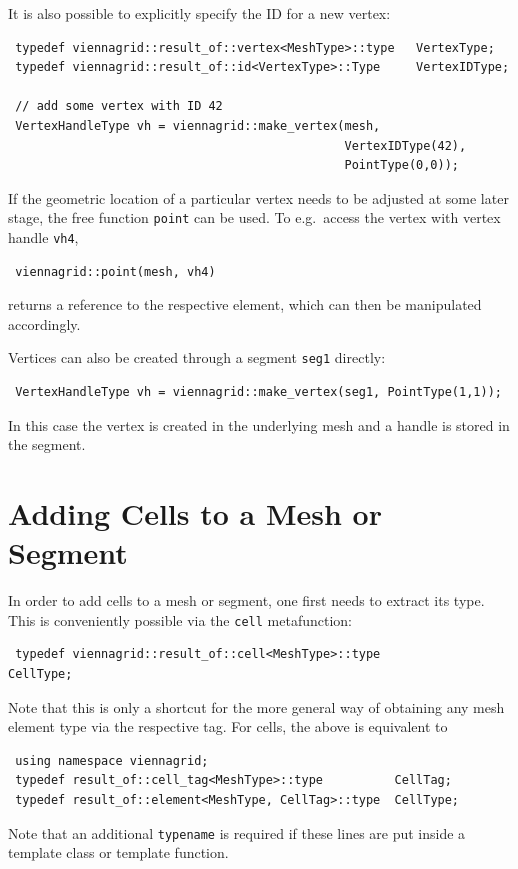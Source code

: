 It is also possible to explicitly specify the ID for a new vertex:
\begin{lstlisting}
 typedef viennagrid::result_of::vertex<MeshType>::type   VertexType;
 typedef viennagrid::result_of::id<VertexType>::Type     VertexIDType;

 // add some vertex with ID 42
 VertexHandleType vh = viennagrid::make_vertex(mesh,
                                               VertexIDType(42),
                                               PointType(0,0));
\end{lstlisting}

If the geometric location of a particular vertex needs to be adjusted at some later stage, the free function \lstinline|point| can be used.
To e.g.~access the vertex with vertex handle \lstinline|vh4|,
\begin{lstlisting}
 viennagrid::point(mesh, vh4)
\end{lstlisting}
returns a reference to the respective element, which can then be manipulated accordingly.

Vertices can also be created through a segment \lstinline|seg1| directly:
\begin{lstlisting}
 VertexHandleType vh = viennagrid::make_vertex(seg1, PointType(1,1));
\end{lstlisting}
In this case the vertex is created in the underlying mesh and a handle is stored in the segment.


\section{Adding Cells to a Mesh or Segment}
In order to add cells to a mesh or segment, one first needs to extract its type.
This is conveniently possible via the \lstinline|cell| metafunction:
\begin{lstlisting}
 typedef viennagrid::result_of::cell<MeshType>::type              CellType;
\end{lstlisting}
Note that this is only a shortcut for the more general way of obtaining any mesh element type via the respective tag.
For cells, the above is equivalent to
\begin{lstlisting}
 using namespace viennagrid;
 typedef result_of::cell_tag<MeshType>::type          CellTag;
 typedef result_of::element<MeshType, CellTag>::type  CellType;
\end{lstlisting}

Note that an additional \lstinline|typename| is required if these lines are put inside a template class or template function.

